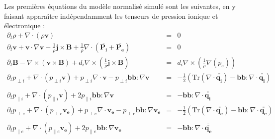 Les premières équations du modèle normalisé simulé sont les suivantes, en y faisant apparaître indépendamment les tenseurs de pression ionique et électronique : 
\begin{eqnarray}
\label{eq:mlf_r} \partial_t \rho + \nabla \cdot \left(\rho \boldsymbol{v}\right) &=& 0\\
\label{eq:mlf_v} \partial_t  \boldsymbol{v} + \boldsymbol{v} \cdot \nabla  \boldsymbol{v} - \frac{1}{\rho} \boldsymbol{j} \times \boldsymbol{B} + \frac{1}{\rho} \nabla \cdot \left(\overline{\boldsymbol{P_i}} + \overline{\boldsymbol{P_e}} \right)  &=& 0  \\
\label{eq:mlf_b} \partial_t \boldsymbol{B} - \nabla \times \left( \boldsymbol{v} \times \boldsymbol{B} \right) +  d_i  \nabla \times \left( \frac{1}{\rho} \boldsymbol{j}\times \boldsymbol{B} \right) &=& d_i \nabla \times \left( \frac{1}{\rho} \nabla \left(  p_e\right) \right)  \\
\label{eq:mlf_pperpi} \partial_t  p_{\perp i }  +  \nabla \cdot \left(p_{\perp i } \boldsymbol{v} \right) +  p_{\perp i }\nabla \cdot\boldsymbol{v} -  p_{\perp i } \boldsymbol{b}\boldsymbol{b} : \nabla \boldsymbol{v}  &=& - \frac{1}{2} \left( \text{Tr}(\nabla \cdot \overline{\overline{\boldsymbol{q_i}}}) - \boldsymbol{b}\boldsymbol{b} : \nabla \cdot \overline{\overline{\boldsymbol{q_i}}} \right) \nonumber \\ && \\
\label{eq:mlf_ppari} \partial_t  p_{\parallel i }  +  \nabla \cdot \left(p_{\parallel i } \boldsymbol{v} \right) +  2 p_{\parallel i }  \boldsymbol{b}\boldsymbol{b} : \nabla \boldsymbol{v}  &=&  - \boldsymbol{b}\boldsymbol{b} : \nabla \cdot \overline{\overline{\boldsymbol{q_i}}}   \\
\label{eq:mlf_pperpe} \partial_t  p_{\perp e }  +  \nabla \cdot \left(p_{\perp e } \boldsymbol{v_e} \right) +  p_{\perp e }\nabla \cdot\boldsymbol{v_e} -  p_{\perp e } \boldsymbol{b}\boldsymbol{b} : \nabla \boldsymbol{v_e}  &=&  - \frac{1}{2} \left( \text{Tr}(\nabla \cdot \overline{\overline{\boldsymbol{q_e}}}) - \boldsymbol{b}\boldsymbol{b} : \nabla \cdot \overline{\overline{\boldsymbol{q_e}}} \right) \nonumber \\ && \\
\label{eq:mlf_ppare} \partial_t  p_{\parallel e }  +  \nabla \cdot \left(p_{\parallel e } \boldsymbol{v_e} \right) +  2 p_{\parallel e }  \boldsymbol{b}\boldsymbol{b} : \nabla \boldsymbol{v_e}  &=& - \boldsymbol{b}\boldsymbol{b} : \nabla \cdot \overline{\overline{\boldsymbol{q_e}}} 
\end{eqnarray}

